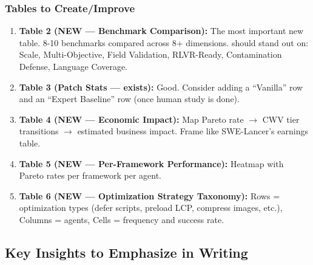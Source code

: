 \subsubsection{Tables to Create/Improve}

\begin{enumerate}
    \item \textbf{Table 2 (NEW --- Benchmark Comparison):} The most important new table. 8-10 benchmarks compared across 8+ dimensions. \OurBench should stand out on: Scale, Multi-Objective, Field Validation, RLVR-Ready, Contamination Defense, Language Coverage.

    \item \textbf{Table 3 (Patch Stats --- exists):} Good. Consider adding a ``Vanilla'' row and an ``Expert Baseline'' row (once human study is done).

    \item \textbf{Table 4 (NEW --- Economic Impact):} Map Pareto rate $\rightarrow$ CWV tier transitions $\rightarrow$ estimated business impact. Frame like SWE-Lancer's earnings table.

    \item \textbf{Table 5 (NEW --- Per-Framework Performance):} Heatmap with Pareto rates per framework per agent.

    \item \textbf{Table 6 (NEW --- Optimization Strategy Taxonomy):} Rows = optimization types (defer scripts, preload LCP, compress images, etc.), Columns = agents, Cells = frequency and success rate.
\end{enumerate}

\subsection{Key Insights to Emphasize in Writing}

